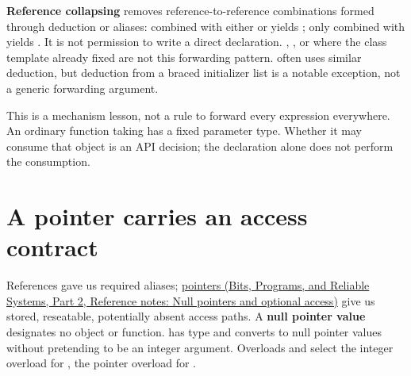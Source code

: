 \textbf{Reference collapsing} removes reference-to-reference combinations formed through deduction or aliases: \BookInlineCode{{\&}}{\&} combined with either \BookInlineCode{{\&}}{\&} or \BookInlineCode{{\&}{\&}}{\&\&} yields \BookInlineCode{{\&}}{\&}; only \BookInlineCode{{\&}{\&}}{\&\&} combined with \BookInlineCode{{\&}{\&}}{\&\&} yields \BookInlineCode{{\&}{\&}}{\&\&}. It is not permission to write a direct  declaration. , , or  where the class template already fixed  are not this forwarding pattern.  often uses similar deduction, but deduction from a braced initializer list is a notable exception, not a generic forwarding argument.

This is a mechanism lesson, not a rule to forward every expression everywhere. An ordinary function taking  has a fixed parameter type. Whether it may consume that object is an API decision; the declaration alone does not perform the consumption.

\section{A pointer carries an access contract}\label{05-engine-i-ch003-a-pointer-carries-an-access-contract}

\hypertarget{05-engine-i-ch003-a-pointer-carries-an-access-contract}{}

References gave us required aliases; \href{../01-Bits-Programs-and-Reliable-Systems-P02/main.pdf\#nameddest=appendix-afae48c31800}{pointers (Bits, Programs, and Reliable Systems, Part 2, Reference notes: Null pointers and optional access)} give us stored, reseatable, potentially absent access paths. A \textbf{null pointer value} designates no object or function.  has type  and converts to null pointer values without pretending to be an integer argument. Overloads  and  select the integer overload for , the pointer overload for .

